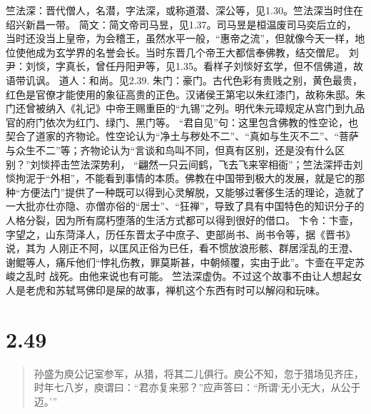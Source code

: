 \documentclass[]{book}
\begin{document}
竺法深：晋代僧人，名潜，字法深，或称道潜、深公等，见1.30。竺法深当时住在绍兴新昌一带。
简文：简文帝司马昱，见1.37。司马昱是桓温废司马奕后立的，当时还没当上皇帝，为会稽王，虽然水平一般，``惠帝之流''，但就像今天一样，地位使他成为玄学界的名誉会长。当时东晋几个帝王大都信奉佛教，结交僧尼。
刘尹：刘惔，字真长，曾任丹阳尹等，见1.35。看样子刘惔好玄学，但不信佛道，故语带讥讽。
道人：和尚。见2.39.
朱门：豪门。古代色彩有贵贱之别，黄色最贵，红色是官僚才能使用的象征高贵的正色。汉诸侯王第宅以朱红漆门，故称朱邸。朱门还曾被纳入《礼记》中帝王赐重臣的``九锡''之列。明代朱元璋规定从宫门到九品官的府门依次为红门、绿门、黑门等。
``君自见''句：这里包含佛教的性空论，也契合了道家的齐物论。性空论认为``净土与秽处不二''、``真如与生灭不二''、``菩萨与众生不二''等；齐物论认为``言谈和鸟叫不同，但真有区别，还是没有什么区别？''刘惔抨击竺法深势利，
``翩然一只云间鹤，飞去飞来宰相衙''；竺法深抨击刘惔拘泥于``外相''，不能看到事情的本质。佛教在中国带到极大的发展，就是它的那种``方便法门''提供了一种既可以得到心灵解脱，又能够过奢侈生活的理论，造就了一大批亦仕亦隐、亦僧亦俗的``居士''、``狂禅''，导致了具有中国特色的知识分子的人格分裂，因为所有腐朽堕落的生活方式都可以得到很好的借口。
卞令：卞壸，字望之，山东菏泽人，历任东晋太子中庶子、吏部尚书、尚书令等，据《晋书》说，其为
人刚正不阿，以匡风正俗为已任，看不惯放浪形骸、群居淫乱的王澄、谢鲲等人，痛斥他们``悖礼伤教，罪莫斯甚，中朝倾覆，实由于此''。卞壸在平定苏峻之乱时
战死。由他来说也有可能。
竺法深虚伪。不过这个故事不由让人想起女人是老虎和苏轼骂佛印是屎的故事，禅机这个东西有时可以解闷和玩味。

\section{2.49}\label{section-95}

\begin{quote}
孙盛为庾公记室参军，从猎，将其二儿俱行。庾公不知，忽于猎场见齐庄，时年七八岁，庾谓曰：``君亦复来邪？''应声答曰：``所谓`无小无大，从公于迈。'''
\end{quote}
\end{document}
